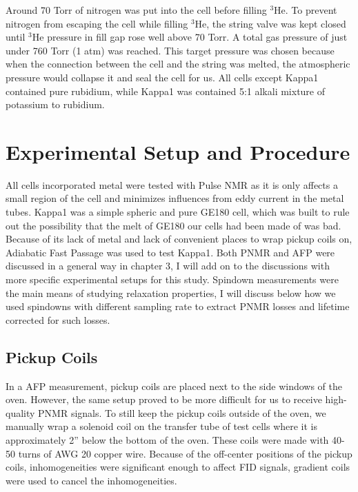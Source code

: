 Around 70 Torr of nitrogen was put into the cell before filling $^{3}$He. To prevent nitrogen from escaping the cell while filling $^{3}$He, the string valve was kept closed until $^{3}$He pressure in fill gap rose well above 70 Torr. A total gas pressure of just under 760 Torr (1 atm) was reached. This target pressure was chosen because when the connection between the cell and the string was melted, the atmospheric pressure would collapse it and seal the cell for us. All cells except Kappa1 contained pure rubidium, while Kappa1 was contained 5:1 alkali mixture of potassium to rubidium.

\section{Experimental Setup and Procedure}

All cells incorporated metal were tested with Pulse NMR as it is only affects a small region of the cell and minimizes influences from eddy current in the metal tubes. Kappa1 was a simple spheric and pure GE180 cell, which was built to rule out the possibility that the melt of GE180 our cells had been made of was bad. Because of its lack of metal and lack of convenient places to wrap pickup coils on, Adiabatic Fast Passage was used to test Kappa1. Both PNMR and AFP were discussed in a general way in chapter 3, I will add on to the discussions with more specific experimental setups for this study. Spindown measurements were the main means of studying relaxation properties, I will discuss below how we used spindowns with different sampling rate to extract PNMR losses and lifetime corrected for such losses.

\subsection{Pickup Coils}

In a AFP measurement, pickup coils are placed next to the side windows of the oven. However, the same setup proved to be more difficult for us to receive high-quality PNMR signals. To still keep the pickup coils outside of the oven, we manually wrap a solenoid coil on the transfer tube of test cells where it is approximately 2'' below the bottom of the oven. These coils were made with 40-50 turns of AWG 20 copper wire. Because of the off-center positions of the pickup coils, inhomogeneities were significant enough to affect FID signals, gradient coils were used to cancel the inhomogeneities.

